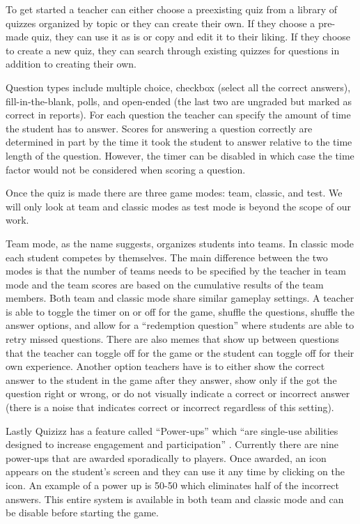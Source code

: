 \documentclass{article}
\begin{document}
To get started a teacher can either choose a preexisting quiz from a library of quizzes organized by topic or they can create their own. If they choose a pre-made quiz, they can use it as is or copy and edit it to their liking. If they choose to create a new quiz, they can search through existing quizzes for questions in addition to creating their own.
\smallskip

Question types include multiple choice, checkbox (select all the correct answers), fill-in-the-blank, polls, and open-ended (the last two are ungraded but marked as correct in reports). For each question the teacher can specify the amount of time the student has to answer. Scores for answering a question correctly are determined in part by the time it took the student to answer relative to the time length of the question. However, the timer can be disabled in which case the time factor would not be considered when scoring a question.
\smallskip

Once the quiz is made there are three game modes: team, classic, and test. We will only look at team and classic modes as test mode is beyond the scope of our work.
\smallskip

Team mode, as the name suggests, organizes students into teams. In classic mode each student competes by themselves. The main difference between the two modes is that the number of teams needs to be specified by the teacher in team mode and the team scores are based on the cumulative results of the team members. Both team and classic mode share similar gameplay settings. A teacher is able to toggle the timer on or off for the game, shuffle the questions, shuffle the answer options, and allow for a ``redemption question'' where students are able to retry missed questions. There are also memes that show up between questions that the teacher can toggle off for the game or the student can toggle off for their own experience. Another option teachers have is to either show the correct answer to the student in the game after they answer, show only if the got the question right or wrong, or do not visually indicate a correct or incorrect answer (there is a noise that indicates correct or incorrect regardless of this setting).
\smallskip

Lastly Quizizz has a feature called ``Power-ups'' which ``are single-use abilities designed to increase engagement and participation'' \cite{quizizz}. Currently there are nine power-ups that are awarded sporadically to players. Once awarded, an icon appears on the student's screen and they can use it any time by clicking on the icon. An example of a power up is 50-50 which eliminates half of the incorrect answers. This entire system is available in both team and classic mode and can be disable before starting the game.
\smallskip
\end{document}

